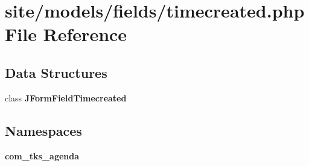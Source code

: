 \section{site/models/fields/timecreated.php File Reference}
\label{site_2models_2fields_2timecreated_8php}
\subsection*{Data Structures}
\begin{DoxyCompactItemize}
\item 
class \textbf{ J\+Form\+Field\+Timecreated}
\end{DoxyCompactItemize}
\subsection*{Namespaces}
\begin{DoxyCompactItemize}
\item 
 \textbf{ com\+\_\+tks\+\_\+agenda}
\end{DoxyCompactItemize}
